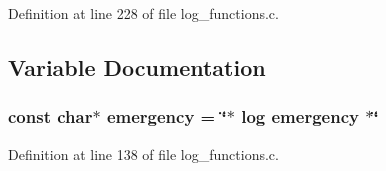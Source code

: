 Definition at line 228 of file log\_\-functions.c.

\subsection{Variable Documentation}
\subsubsection[{emergency}]{\setlength{\rightskip}{0pt plus 5cm}const char$\ast$ {\bf emergency} = \char`\"{}$\ast$ log {\bf emergency} $\ast$\char`\"{}}\label{log__functions_8c_adf2d2993b6c6908a2e296f5b5418d915}


Definition at line 138 of file log\_\-functions.c.